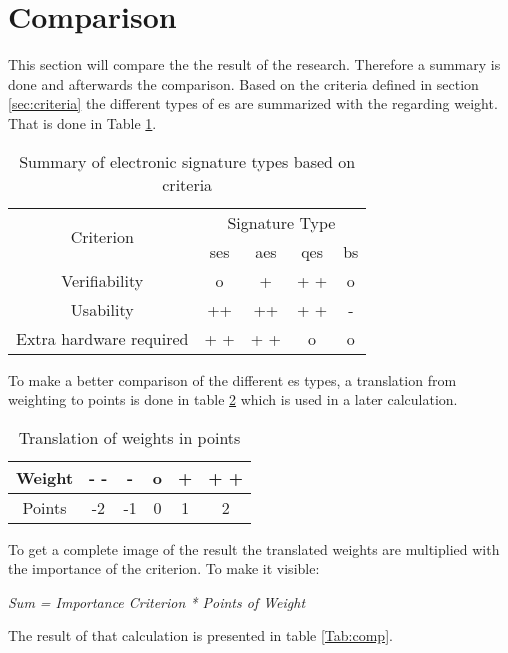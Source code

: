 \section{Comparison} \label{sec:comp}
This section will compare the the result of the research. Therefore a summary is done and afterwards the comparison.
Based on the criteria defined in section \ref{sec:criteria} the different types of \gls{es} are summarized with the regarding weight. That is done in Table \ref{Tab:summary}.

\begin{table}[h]
	\begin{tabular}{|c|c|c|c|c|} \hline
		\multirow{2}{*}{Criterion} & \multicolumn{4}{|c|}{Signature Type} \\
								   & \gls{ses} & \gls{aes} & \gls{qes} & \gls{bs} \\ \cline{1-5}
		Verifiability & o & + & + + & o \\ \hline
		Usability & ++ & ++ & + + & - \\ \hline
		Extra hardware required & + + & + + & o & o \\ \hline
	\end{tabular}
	\centering
	\caption{Summary of electronic signature types based on criteria}
	\label{Tab:summary}
\end{table}

To make a better comparison of the different \gls{es} types, a translation from weighting to points is done in table \ref{Tab:Translation} which is used in a later calculation.

\begin{table}[h]
	\begin{tabular}{|c|c|c|c|c|c|} \hline
		Weight & - - & - & o & + & + + \\ \hline
		Points & -2 & -1 & 0 & 1 & 2 \\ \hline
	\end{tabular}
	\centering
	\caption{Translation of weights in points}
	\label{Tab:Translation}
\end{table}

To get a complete image of the result the translated weights are multiplied with the importance of the criterion. To make it visible:
\begin{center}
	\textit{Sum = Importance Criterion * Points of Weight}
\end{center}
The result of that calculation is presented in table \ref{Tab:comp}.

